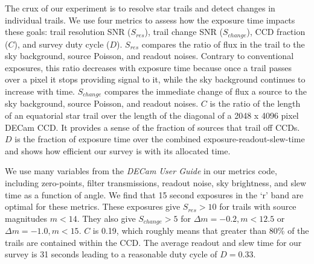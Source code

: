 \documentclass[11pt]{article}
\begin{document}

%

\technicaldescription

The crux of our experiment is to resolve star trails and detect changes in individual trails. We use four metrics to assess how the exposure time impacts these goals: trail resolution SNR ($S_{res}$), trail change SNR ($S_{change}$), CCD fraction ($C$), and survey duty cycle ($D$). $S_{res}$ compares the ratio of flux in the trail to the sky background, source Poisson, and readout noises. Contrary to conventional exposures, this ratio decreases with exposure time because once a trail passes over a pixel it stops providing signal to it, while the sky background continues to increase with time. $S_{change}$ compares the immediate change of flux a source to the sky background, source Poisson, and readout noises. $C$ is the ratio of the length of an equatorial star trail over the length of the diagonal of a 2048 x 4096 pixel DECam CCD. It provides a sense of the fraction of sources that trail off CCDs. $D$ is the fraction of exposure time over the combined exposure-readout-slew-time and shows how efficient our survey is with its allocated time.

We use many variables from the \textit{DECam User Guide} in our metrics code, including zero-points, filter transmissions, readout noise, sky brightness, and slew time as a function of angle. We find that 15 second exposures in the `r' band are optimal for these metrics. These exposures give $S_{res} > 10$ for trails with source magnitudes $m < 14$. They also give $S_{change} > 5$ for $\Delta m = -0.2, m < 12.5$ or $\Delta m = -1.0, m < 15$. $C$ is 0.19, which roughly means that greater than 80\% of the trails are contained within the CCD. The average readout and slew time for our survey is 31 seconds leading to a reasonable duty cycle of $D = 0.33$.
\end{document}
